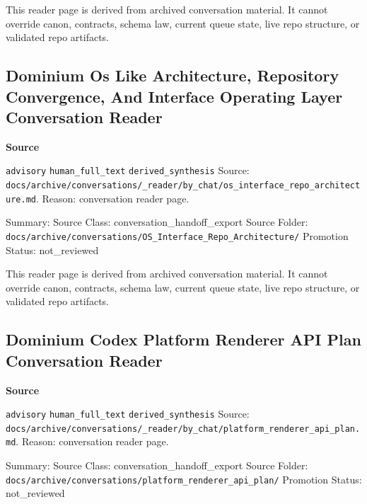 \documentclass[9pt,a4paper,openany]{book}
\newcommand{\vonecallout}[3]{\par\medskip\noindent\begingroup\setlength{\fboxsep}{7pt}\colorbox{DomCalloutBg}{\parbox{0.94\linewidth}{\textbf{\textcolor{#1}{#2}}\par #3}}\endgroup\par\medskip}
\begin{document}
This reader page is derived from archived conversation material.\allowbreak{} It cannot override canon, contracts, schema law, current queue state, live repo structure, or validated repo artifacts.\allowbreak{}



\subsection{Dominium Os Like Architecture, Repository Convergence, And Interface Operating Layer Conversation Reader}

\vonecallout{DomSlate}{Source}{\texttt{advisory} \texttt{human\_\allowbreak{}full\_\allowbreak{}text} \texttt{derived\_\allowbreak{}synthesis} Source: \texttt{docs/\allowbreak{}archive/\allowbreak{}conversations/\allowbreak{}\_\allowbreak{}reader/\allowbreak{}by\_\allowbreak{}chat/\allowbreak{}os\_\allowbreak{}interface\_\allowbreak{}repo\_\allowbreak{}architecture.\allowbreak{}md}.\allowbreak{} Reason: conversation reader page.\allowbreak{}}

Summary: Source Class: conversation\_\allowbreak{}handoff\_\allowbreak{}export Source Folder: \texttt{docs/\allowbreak{}archive/\allowbreak{}conversations/\allowbreak{}OS\_\allowbreak{}Interface\_\allowbreak{}Repo\_\allowbreak{}Architecture/\allowbreak{}} Promotion Status: not\_\allowbreak{}reviewed


This reader page is derived from archived conversation material.\allowbreak{} It cannot override canon, contracts, schema law, current queue state, live repo structure, or validated repo artifacts.\allowbreak{}



\subsection{Dominium Codex Platform Renderer API Plan Conversation Reader}

\vonecallout{DomSlate}{Source}{\texttt{advisory} \texttt{human\_\allowbreak{}full\_\allowbreak{}text} \texttt{derived\_\allowbreak{}synthesis} Source: \texttt{docs/\allowbreak{}archive/\allowbreak{}conversations/\allowbreak{}\_\allowbreak{}reader/\allowbreak{}by\_\allowbreak{}chat/\allowbreak{}platform\_\allowbreak{}renderer\_\allowbreak{}api\_\allowbreak{}plan.\allowbreak{}md}.\allowbreak{} Reason: conversation reader page.\allowbreak{}}

Summary: Source Class: conversation\_\allowbreak{}handoff\_\allowbreak{}export Source Folder: \texttt{docs/\allowbreak{}archive/\allowbreak{}conversations/\allowbreak{}platform\_\allowbreak{}renderer\_\allowbreak{}api\_\allowbreak{}plan/\allowbreak{}} Promotion Status: not\_\allowbreak{}reviewed
\end{document}
